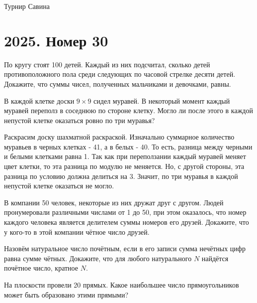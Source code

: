 \documentclass[11pt, a4paper]{common/document_template}
\begin{document}
\begin{titlepage}
  \begin{center}
	\Huge{Турнир Савина}
  \end{center}
\end{titlepage} 

\chapter{2025. Номер 30}

\begin{exercise}
По кругу стоят 100 детей. Каждый из них подсчитал, сколько детей
противоположного пола среди следующих по часовой стрелке десяти детей. Докажите,
что суммы чисел, полученных мальчиками и девочками, равны.
\end{exercise}

\begin{exercise}[13]
В каждой клетке доски $9 \times 9$ сидел муравей. В некоторый момент каждый муравей
переполз в соседнюю по стороне клетку. Могло ли после этого в каждой непустой клетке
оказаться ровно по три муравья?
\end{exercise}

\begin{Solution}
Раскрасим доску шахматной раскраской. Изначально суммарное количество муравьев в черных клетках - 41, а в белых - 40.
То есть, разница между черными и белыми клетками равна 1. Так как при переползании каждый муравей меняет цвет клетки, 
то эта разница по модулю не меняется. Но, с другой стороны, эта разница по условию должна делиться на 3. Значит, по три муравья
в каждой непустой клетке оказаться не могло.
\end{Solution}

\begin{exercise}[31]
В компании 50 человек, некоторые из них дружат друг с другом. Людей
пронумеровали различными числами от 1 до 50, при этом оказалось, что номер каждого
человека является делителем суммы номеров его друзей. Докажите, что у кого-то в этой
компании чётное число друзей.
\end{exercise}

\begin{exercise}
Назовём натуральное число почётным, если в его записи сумма нечётных цифр
равна сумме чётных. Докажите, что для любого натурального $N$ найдётся почётное число,
кратное $N$.
\end{exercise}

\begin{exercise}[36]
На плоскости провели 20 прямых. Какое наибольшее число прямоугольников может
быть образовано этими прямыми?
\end{exercise}
\end{document}
